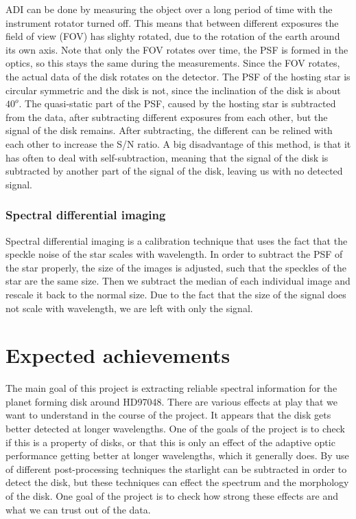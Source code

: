 \documentclass[twoside,single]{lion-msc}
\begin{document}
ADI can be done by measuring the object over a long period of time with the instrument rotator turned off. This means that between different exposures the field of view (FOV) has slighty rotated, due to the rotation of the earth around its own axis. Note that only the FOV rotates over time, the PSF is formed in the optics, so this stays the same during the measurements. Since the FOV rotates, the actual data of the disk rotates on the detector. The PSF of the hosting star is circular symmetric and the disk is not, since the inclination of the disk is about $40^o$. The quasi-static part of the PSF, caused by the hosting star is subtracted from the data, after subtracting different exposures from each other, but the signal of the disk remains. After subtracting, the different can be relined with each other to increase the S/N ratio. A big disadvantage of this method, is that it has often to deal with self-subtraction, meaning that the signal of the disk is subtracted by another part of the signal of the disk, leaving us with no detected signal. \cite{Marois2005} 

\subsection{Spectral differential imaging}
Spectral differential imaging is a calibration technique that uses the fact that the speckle noise of the star scales with wavelength. In order to subtract the PSF of the star properly, the size of the images is adjusted, such that the speckles of the star are the same size. Then we subtract the median of each individual image and rescale it back to the normal size. Due to the fact that the size of the signal does not scale with wavelength, we are left with only the signal.

\chapter{Expected achievements}
The main goal of this project is extracting reliable spectral information for the planet forming disk around HD97048. There are various effects at play that we want to understand in the course of the project. It appears that the disk gets better detected at longer wavelengths. One of the goals of the project is to check if this is a property of disks, or that this is only an effect of the adaptive optic performance getting better at longer wavelengths, which it generally does. By use of different post-processing techniques the starlight can be subtracted in order to detect the disk, but these techniques can effect the spectrum and the morphology of the disk. One goal of the project is to check how strong these effects are and what we can trust out of the data.
\bigskip
\end{document}
